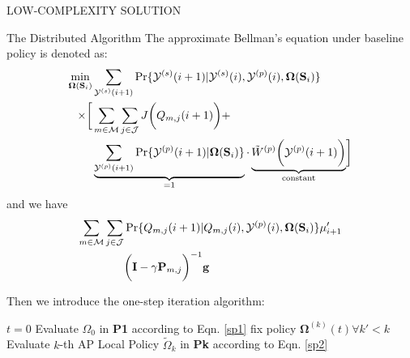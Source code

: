\documentclass[10pt, conference, letterpaper]{IEEEtran}
\newcommand{\mat}{\mathbf}
\renewcommand{\vec}{\mathbf}
\DeclarePairedDelimiter{\Paren}{\bigg(}{\bigg)}
\DeclarePairedDelimiter{\Bracket}{\bigg[}{\bigg]}
\newcommand{\esSet}{\mathcal{M}}
\newcommand{\jSpace}{\mathcal{J}}
\newcommand{\Stat}{\mathbf{S}}
\newcommand{\Obsv}{\mathcal{Y}}
\newcommand{\Policy}{\boldsymbol{\Omega}}
\newcommand{\BPolicy}{\Policy} %
\begin{document}
\begin{section}{LOW-COMPLEXITY SOLUTION}
        \begin{subsection}{The Distributed Algorithm}
            The approximate Bellman's equation under baseline policy is denoted as:
            \begin{align}
                \min_{\Policy(\Stat_i)}& \sum_{\Obsv^{(s)}(i+1)} \Pr\{\Obsv^{(s)}(i+1)|\Obsv^{(s)}(i), \Obsv^{(p)}(i), \BPolicy(\Stat_i)\}
                \nonumber\\
                \times \Bracket{
                    & \sum_{m\in\esSet}\sum_{j\in\jSpace} J\Paren{Q_{m,j}(i+1)}
                    +
                    \nonumber\\
                    & \underbrace{\sum_{\Obsv^{(p)}(i+1)} \Pr\{\Obsv^{(p)}(i+1)|\BPolicy(\Stat_i)\}}_{\text{=1}}
                    \cdot \underbrace{\tilde{W}^{(p)} \Paren{\Obsv^{(p)}(i+1)}}_{\text{constant}}
                } 
            \end{align}
            and we have
            \begin{align}
                \sum_{m\in\esSet}\sum_{j\in\jSpace} &\Pr\{Q_{m,j}(i+1)|Q_{m,j}(i), \Obsv^{(p)}(i), \Policy(\Stat_i)\} \mu'_{i+1}
                    \nonumber\\
                    &\Paren{ \mat{I}-\gamma\mat{P}_{m,j} }^{-1} \vec{g}
            \end{align}

            Then we introduce the one-step iteration algorithm:
            \begin{algorithm}[H]
                \caption{Distributed Algorithm for }
                \begin{algorithmic}[1]
                    \STATE $t = 0$
                        \STATE Evaluate $\Omega_0$ in \textbf{P1} according to Eqn. \ref{sp1}
                            \STATE fix policy $\vec{\Omega}^{(k)}(t) \forall k' < k$
                            \STATE Evaluate $k$-th AP Local Policy $\tilde{\Omega}_k$ in \textbf{Pk} according to Eqn. \ref{sp2}
                        \ENDFOR
                    \ENDFOR
                \end{algorithmic}
            \end{algorithm}
        \end{subsection}
        
    \end{section}
\end{document}
